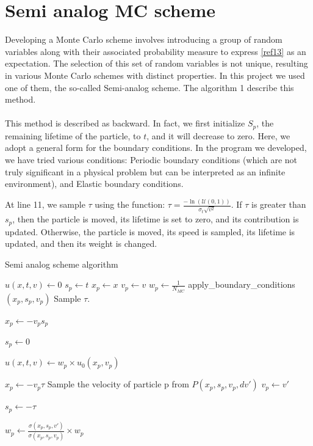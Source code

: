 \documentclass[a4paper, 11pt]{article}
\begin{document}
\section{Semi analog MC scheme}

Developing a Monte Carlo scheme involves introducing a group of random variables along with their associated probability measure to express \ref{ref13} as an expectation. The selection of this set of random variables is not unique, resulting in various Monte Carlo schemes with distinct properties. In this project we used one of them, the so-called Semi-analog scheme. The algorithm 1 describe this method.


\paragraph{}
This method is described as backward. In fact, we first initialize $S_p$, the remaining lifetime of the particle, to $t$, and it will decrease to zero. Here, we adopt a general form for the boundary conditions. In the program we developed, we have tried various conditions: Periodic boundary conditions (which are not truly significant in a physical problem but can be interpreted as an infinite environment), and Elastic boundary conditions.

At line 11, we sample $\tau$ using the function: $\tau = \frac{-\ln(\mathcal{U}(0,1))}{\sigma_t \sqrt{v^2}}$. If $\tau$ is greater than $s_p$, then the particle is moved, its lifetime is set to zero, and its contribution is updated. Otherwise, the particle is moved, its speed is sampled, its lifetime is updated, and then its weight is changed.






\begin{algorithm}
	\caption{Semi analog scheme algorithm}
	\begin{algorithmic}[1]
		\State $u(x, t, v) \gets 0$
		\State $s_p \gets t$ 
		\State $x_p \gets x$
		\State $v_p \gets v$
		\State $w_p \gets \frac{1}{N_{MC}}$
		\State apply\_boundary\_conditions$(x_p, s_p, v_p)$
		\EndIf
		\State Sample $\tau$.



		\State $x_p \gets - v_p s_p$

		\State $s_p \gets 0$

		\State $u(x, t, v) \gets w_p \times u_0(x_p, v_p)$
		\Else

		\State $x_p \gets - v_p \tau$
		\State Sample the velocity of particle p from $P(x_p, s_p, v_p, dv')$
		\State $v_p \gets v'$

		\State $s_p \gets - \tau$

		\State $w_p \gets \frac{\sigma(x_p, s_p, v')}{\sigma(x_p, s_p, v_p)} \times w_p$
		\EndIf
		\EndWhile
		\EndFor
	\end{algorithmic}
\end{algorithm}
\end{document}
